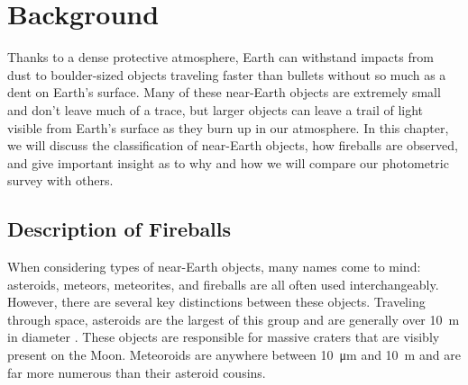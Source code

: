 \chapter{Background}

Thanks to a dense protective atmosphere, Earth can withstand impacts from dust to boulder-sized objects traveling faster than bullets without so much as a dent on Earth's surface.
Many of these near-Earth objects are extremely small and don't leave much of a trace, but larger objects can leave a trail of light visible from Earth's surface as they burn up in our atmosphere.
In this chapter, we will discuss the classification of near-Earth objects, how fireballs are observed, and give important insight as to why and how we will compare our photometric survey with others.


\section{Description of Fireballs}

When considering types of near-Earth objects, many names come to mind: asteroids, meteors, meteorites, and fireballs are all often used interchangeably. 
However, there are several key distinctions between these objects.  
Traveling through space, asteroids are the largest of this group and are generally over \SI{10}{\meter} in diameter \cite{steel_meteoroid_1996}. 
These objects are responsible for massive craters that are visibly present on the Moon.
Meteoroids are anywhere between \SI{10}{\micro\meter} and \SI{10}{\meter} and are far more numerous than their asteroid cousins.  

